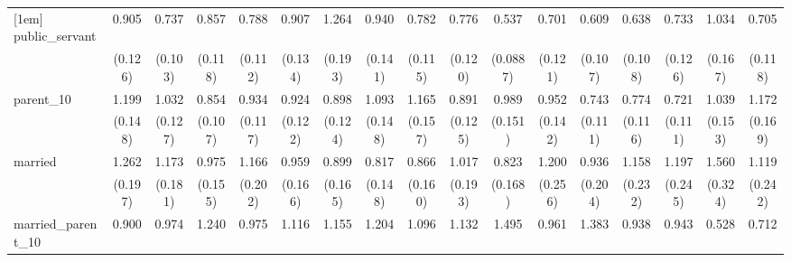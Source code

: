 {\begin{tabular}{l*{16}{c}}
[1em]
public\_servant      &       0.905         &       0.737\sym{*}  &       0.857         &       0.788         &       0.907         &       1.264         &       0.940         &       0.782         &       0.776         &       0.537\sym{***}&       0.701\sym{*}  &       0.609\sym{**} &       0.638\sym{**} &       0.733         &       1.034         &       0.705\sym{*}  \\
                    &     (0.126)         &     (0.103)         &     (0.118)         &     (0.112)         &     (0.134)         &     (0.193)         &     (0.141)         &     (0.115)         &     (0.120)         &    (0.0887)         &     (0.121)         &     (0.107)         &     (0.108)         &     (0.126)         &     (0.167)         &     (0.118)         \\
[1em]
parent\_10           &       1.199         &       1.032         &       0.854         &       0.934         &       0.924         &       0.898         &       1.093         &       1.165         &       0.891         &       0.989         &       0.952         &       0.743\sym{*}  &       0.774         &       0.721\sym{*}  &       1.039         &       1.172         \\
                    &     (0.148)         &     (0.127)         &     (0.107)         &     (0.117)         &     (0.122)         &     (0.124)         &     (0.148)         &     (0.157)         &     (0.125)         &     (0.151)         &     (0.142)         &     (0.111)         &     (0.116)         &     (0.111)         &     (0.153)         &     (0.169)         \\
[1em]
married             &       1.262         &       1.173         &       0.975         &       1.166         &       0.959         &       0.899         &       0.817         &       0.866         &       1.017         &       0.823         &       1.200         &       0.936         &       1.158         &       1.197         &       1.560\sym{*}  &       1.119         \\
                    &     (0.197)         &     (0.181)         &     (0.155)         &     (0.202)         &     (0.166)         &     (0.165)         &     (0.148)         &     (0.160)         &     (0.193)         &     (0.168)         &     (0.256)         &     (0.204)         &     (0.232)         &     (0.245)         &     (0.324)         &     (0.242)         \\
[1em]
married\_parent\_10   &       0.900         &       0.974         &       1.240         &       0.975         &       1.116         &       1.155         &       1.204         &       1.096         &       1.132         &       1.495         &       0.961         &       1.383         &       0.938         &       0.943         &       0.528\sym{**} &       0.712         \\

\end{tabular}}
